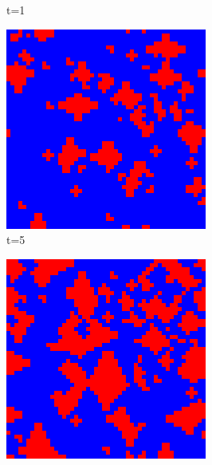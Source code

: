 \documentclass[a4paper, 11pt]{article}
\begin{document}
\begin{figure}[H]
\begin{subfigure}{.25\textwidth}
  \caption{t=1}
\end{subfigure}%
\begin{subfigure}{.25\textwidth}
  \centering
  \includegraphics[width=0.9\linewidth]{PRISONERS_DILEMMA_VON_NEUMANN_50x50_t05}
  \caption{t=5}
\end{subfigure}%
\begin{subfigure}{.25\textwidth}
  \centering
  \includegraphics[width=0.9\linewidth]{PRISONERS_DILEMMA_VON_NEUMANN_50x50_t10}

\end{subfigure}
\end{figure}
\end{document}
